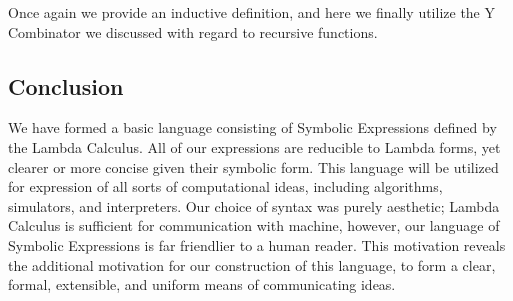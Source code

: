 Once again we provide an inductive definition, and here we finally utilize the Y 
Combinator we discussed with regard to recursive functions.

\subsection{Conclusion}
We have formed a basic language consisting of Symbolic Expressions defined by the 
Lambda Calculus. All of our expressions are reducible to Lambda forms, yet clearer 
or more concise given their symbolic form. This language will be utilized for 
expression of all sorts of computational ideas, including algorithms, simulators, 
and interpreters. Our choice of syntax was purely aesthetic; Lambda Calculus is 
sufficient for communication with machine, however, our language of Symbolic 
Expressions is far friendlier to a human reader. This motivation reveals the 
additional motivation for our construction of this language, to form a clear, 
formal, extensible, and uniform means of communicating ideas.
